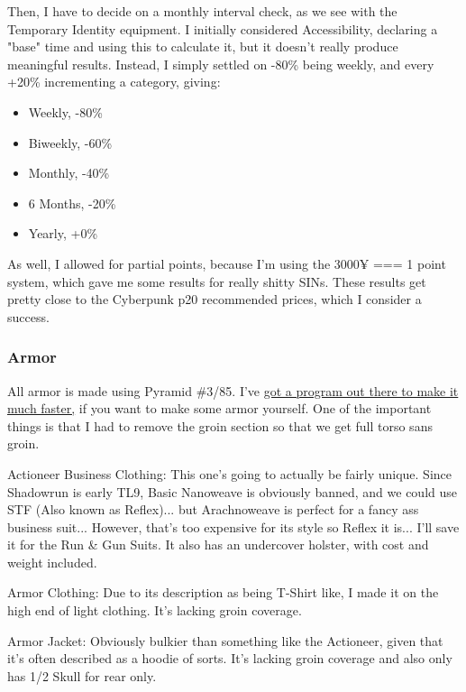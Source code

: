 \begin{multicols*}{2}
	Then, I have to decide on a monthly interval check, as we see with the Temporary Identity equipment. I initially considered Accessibility, declaring a "base" time and using this to calculate it, but it doesn't really produce meaningful results. Instead, I simply settled on -80\% being weekly, and every +20\% incrementing a category, giving:
	
	\begin{itemize}
		\itemsep 0pt
		\item Weekly, -80\%
		\item Biweekly, -60\%
		\item Monthly, -40\%
		\item 6 Months, -20\%
		\item Yearly, +0\%
	\end{itemize}
	
	As well, I allowed for partial points, because I'm using the 3000¥ === 1 point system, which gave me some results for really shitty SINs. These results get pretty close to the Cyberpunk p20 recommended prices, which I consider a success.
	
	\subsubsection{Armor}
	
	All armor is made using Pyramid \#3/85. I've \textcolor{Blue}{\href{https://github.com/ingeanus/GURPS_Eidetic_Memory}{got a program out there to make it much faster,}} if you want to make some armor yourself. One of the important things is that I had to remove the groin section so that we get full torso sans groin.
	
	Actioneer Business Clothing: This one's going to actually be fairly unique. Since Shadowrun is early TL9, Basic Nanoweave is obviously banned, and we could use STF (Also known as Reflex)... but Arachnoweave is perfect for a fancy ass business suit... However, that's too expensive for its style so Reflex it is... I'll save it for the Run \& Gun Suits. It also has an undercover holster, with cost and weight included.
	
	Armor Clothing: Due to its description as being T-Shirt like, I made it on the high end of light clothing. It's lacking groin coverage.
	
	Armor Jacket: Obviously bulkier than something like the Actioneer, given that it's often described as a hoodie of sorts. It's lacking groin coverage and also only has 1/2 Skull for rear only.
	

\end{multicols*}

